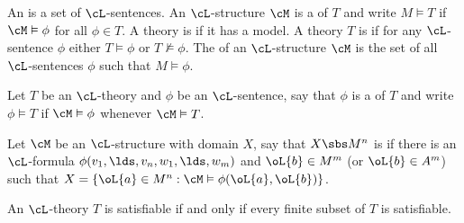 \documentclass[article, a4paper, twoside]{universal}
\begin{document}
\begin{dfn}
    An  is a set of $\cL$-sentences. An $\cL$-structure $\cM$ is a  of $T$ and write $M\vDash T$ if $\cM\vDash\phi$ for all $\phi\in T$. A theory is  if it has a model. A theory $T$ is  if for any $\cL$-sentence $\phi$ either $T\vDash\phi$ or $T\nvDash\phi$. The  of an $\cL$-structure $\cM$ is the set of all $\cL$-sentences $\phi$ such that $M\vDash\phi$.
\end{dfn}

\begin{dfn}
    Let $T$ be an $\cL$-theory and $\phi$ be an $\cL$-sentence, say that $\phi$ is a  of $T$ and write $\phi\vDash T$ if $\cM\vDash\phi$ whenever $\cM\vDash T$.
\end{dfn}

\begin{dfn}
    Let $\cM$ be an $\cL$-structure with domain $X$, say that $X\sbs M^n$ is  if there is an $\cL$-formula $\phi(v_{1},\lds,v_{n},w_{1},\lds,w_{m})$ and $\oL{b}\in M^{m}$ (or $\oL{b}\in A^{m}$) such that $X=\{\oL{a}\in M^{n}:\cM\vDash\phi(\oL{a},\oL{b})\}$.
\end{dfn}

\begin{thm}[Compactness]
    An $\cL$-theory $T$ is satisfiable if and only if every finite subset of $T$ is satisfiable.
\end{thm}

\printref
\end{document}
